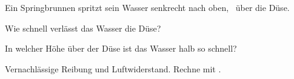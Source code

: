 Ein Springbrunnen spritzt sein Wasser senkrecht nach oben, \HsO\ über die Düse.

\begin{abcliste}
\abc
Wie schnell verlässt das Wasser die Düse?

\abc
In welcher Höhe über der Düse ist das Wasser halb so schnell?
\end{abcliste}

Vernachlässige Reibung und Luftwiderstand. Rechne mit \gO.
